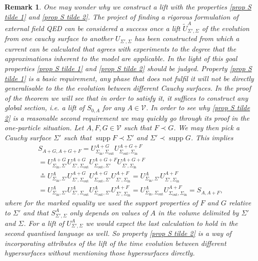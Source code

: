 \documentclass[b5paper,draft,openbib,12pt]{memoir}
\newtheorem{Remark}[Def]{Remark}
\DeclareMathOperator*{\supp}{supp}
\begin{document}
\begin{Remark}\label{rmk phase construction}
One may wonder why we construct a lift with the properties 
\eqref{prop S tilde 1} and \eqref{prop S tilde 2}. 
The project of finding a rigorous formulation of external 
field QED can be considered a success once a lift 
\(\tilde{U}^A_{\Sigma',\Sigma}\) of the evolution from 
one cauchy surface to another \(U_{\Sigma',\Sigma}\) 
has been constructed 
from which a current can be calculated that agrees 
with experiments to the degree that the approximations 
inherent to the model are applicable. In the light of 
this goal properties \eqref{prop S tilde 1} and 
\eqref{prop S tilde 2} should be judged. Property 
\eqref{prop S tilde 1} is a basic requirement,
any phase that does not fulfil it will not be directly 
generalisable to the the evolution between different 
Cauchy surfaces. In the proof of the theorem we will see 
that in order to 
satisfy it, it suffices to construct any global section, i.e.
a lift of \(S_{0,A}\) for any \(A\in\mathcal{V}\). 
In order to see why \eqref{prop S tilde 2} is a reasonable 
second requirement we may quickly go through its proof in 
the one-particle situation. Let \(A,F,G\in\mathcal{V}\) 
such that \(F\prec G\). We may then pick  a Cauchy 
surface \(\Sigma'\) such that \(\supp F\prec \Sigma'\) 
and \(\Sigma'\prec \supp G\). 
This implies 
\begin{align}
  S_{A+G,A+G+F}=U^{A+G}_{\Sigma_{\text{in}},\Sigma_{\text{out}}} U^{A+G+F}_{\Sigma_{\text{out}},\Sigma_{\text{in}}}\\
  = U^{A+G}_{\Sigma_{\text{in}},\Sigma'}U^{A+G}_{\Sigma',\Sigma_{\text{out}}}U^{A+G+F}_{\Sigma_{\text{out}},\Sigma'}U^{A+G+F}_{\Sigma',\Sigma_{\text{in}}}\\
  \overset{*}{=}U^{A}_{\Sigma_{\text{in}},\Sigma'}U^{A+G}_{\Sigma',\Sigma_{\text{out}}}U^{A+G}_{\Sigma_{\text{out}},\Sigma'}U^{A+F}_{\Sigma',\Sigma_{\text{in}}}
  =U^{A}_{\Sigma_{\text{in}},\Sigma'}U^{A+F}_{\Sigma',\Sigma_{\text{in}}}\\
  =U^{A}_{\Sigma_{\text{in}},\Sigma'}U^{A}_{\Sigma',\Sigma_{\text{out}}}U^{A}_{\Sigma_{\text{out}},\Sigma'}U^{A+F}_{\Sigma',\Sigma_{\text{in}}}
  =U^{A}_{\Sigma_{\text{in}},\Sigma_{\text{out}}} U^{A+F}_{\Sigma_{\text{out}},\Sigma_{\text{in}}}
  =S_{A,A+F},
\end{align}
where for the marked equality we used the support properties 
of \(F\) and \(G\) relative to \(\Sigma'\) and that 
\(S^A_{\Sigma',\Sigma}\) only depends on values of \(A\) in 
the volume delimited by \(\Sigma'\) and \(\Sigma\). 
For a lift 
of \(U^A_{\Sigma',\Sigma}\) we would expect the last calculation 
to hold in the second quantised language as well. So 
property \eqref{prop S tilde 2} is a way of incorporating
attributes of the lift of the time evolution 
between different hypersurfaces 
without mentioning those hypersurfaces directly.
\end{Remark}
\end{document}

